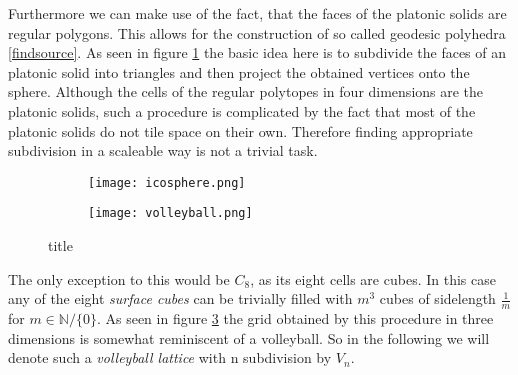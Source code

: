Furthermore we can make use of the fact, that the faces of the platonic solids are regular polygons. This allows for the construction of so called geodesic polyhedra \ref{findsource}. As seen in figure \ref{fig:icospherePic} the basic idea here is to subdivide the faces of an platonic solid into triangles and then project the obtained vertices onto the sphere. Although the cells of the regular polytopes in four dimensions are the platonic solids, such a procedure is complicated by the fact that most of the platonic solids do not tile space on their own. Therefore finding appropriate subdivision in a scaleable way is not a trivial task.\\

\begin{figure}
 \centering
 \begin{subfigure}{0.9\textwidth}
  \texttt{[image: icosphere.png]}
  \caption{}
  \label{fig:icospherePic}
 \end{subfigure}
 \begin{subfigure}{0.9\textwidth}
  \texttt{[image: volleyball.png]}
  \caption{}
  \label{fig:volleyPic}
 \end{subfigure}
 \caption{title}
\end{figure}

The only exception to this would be $C_8$, as its eight cells are cubes. In this case any of the eight \emph{surface cubes} can be trivially filled with $m^3$ cubes of sidelength $\frac{1}{m}$ for $m \in \mathbb{N}/\{0\}$. As seen in figure \ref{fig:volleyPic} the grid obtained by this procedure in three dimensions is somewhat reminiscent of a volleyball. So in the following we will denote such a \emph{volleyball lattice} with n subdivision by $V_n$. \\

